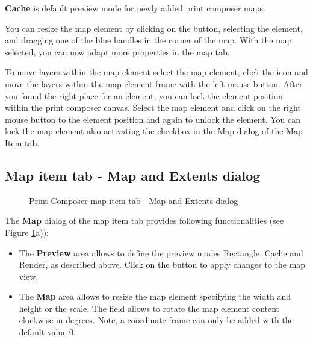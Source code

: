 \textbf{Cache} is default preview mode for newly added print composer maps.

You can resize the map element by clicking on the
 button, selecting the
element, and dragging one of the blue handles in the corner of the map. With
the map selected, you can now adapt more properties in the map 
tab.

To move layers within the map element select the map element, click
the  icon
and move the layers within the map element frame with the left mouse button.
After you found the right place for an element, you can lock the element
position within the print composer canvas. Select the map element and click
on the right mouse button to  the element
position and again to unlock the element. You can lock the map element also
activating the  checkbox in the Map dialog
of the Map Item tab. 

\subsection{Map item tab - Map and Extents dialog}

\begin{figure}[ht]
  \centering
    \hspace{1cm}
  \caption{Print Composer map item tab - Map and Extents dialog \nixcaption}\label{fig:mapdialog} 
\end{figure}


The \textbf{Map} dialog of the map item tab provides following functionalities
(see Figure \ref{fig:mapdialog}a)):
 
\begin{itemize}[label=--]
\item The \textbf{Preview} area allows to define the preview modes Rectangle,
Cache and Render, as described above. Click on the 
button to apply changes to the map view.
\item The \textbf{Map} area allows to resize the map element specifying the
width and height or the scale. The  field allows to
rotate the map element content clockwise in degrees. Note, a coordinate frame
can only be added with the default value 0.  
\end{itemize}

